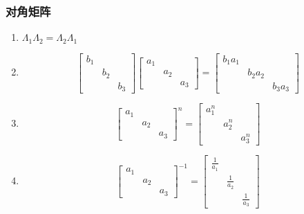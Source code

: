 \documentclass[a4paper,12pt]{article}
\begin{document}
    \subsubsection{对角矩阵}
    \begin{enumerate}
        \item $\Lambda_1\Lambda_2 = \Lambda_2\Lambda_1$
        \item
        \[
            \begin{bmatrix}
                b_1 &     &     \\
                & b_2 &     \\
                &     & b_3
            \end{bmatrix}
            \begin{bmatrix}
                a_1 &     &     \\
                & a_2 &     \\
                &     & a_3
            \end{bmatrix}
            =
            \begin{bmatrix}
                b_1 a_1 &         &         \\
                & b_2 a_2 &         \\
                &         & b_3 a_3
            \end{bmatrix}
        \]
        \item
        \[
            \begin{bmatrix}
                a_1 &     &     \\
                & a_2 &     \\
                &     & a_3
            \end{bmatrix}^n
            = \begin{bmatrix}
                  a_{1}^n &         &         \\
                  & a_{2}^n &         \\
                  &         & a_{3}^n
            \end{bmatrix}
        \]
        \item
        \[
            \begin{bmatrix}
                a_1 &     &     \\
                & a_2 &     \\
                &     & a_3
            \end{bmatrix}^{-1}
            = \begin{bmatrix}
                  \frac{1}{a_{1}} &                 &                 \\
                  & \frac{1}{a_{2}} &                 \\
                  &                 & \frac{1}{a_{3}}
            \end{bmatrix}
        \]
    \end{enumerate}
\end{document}
